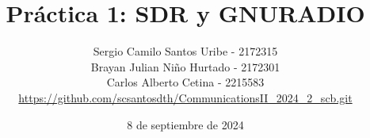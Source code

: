 \documentclass{journal}[IEEEtran, twocolumn]             %
\newcommand{\dochead}{Práctica 1}
\newcommand{\docsubhead}{SDR y GNURADIO}
\newcommand{\titulo}{\dochead: \docsubhead}
\newcommand{\fecha}{8 de septiembre de 2024}
\begin{document}

\title{\textbf{\titulo}}            %

\author{
Sergio Camilo Santos Uribe - 2172315\\
Brayan Julian Niño Hurtado - 2172301\\
Carlos Alberto Cetina - 2215583\\
\href{https://github.com/scsantosdth/CommunicationsII_2024_2_scb.git}{https://github.com/scsantosdth/CommunicationsII_2024_2_scb.git}
}


\date{\fecha}                       %

\maketitle                          %
\thispagestyle{fancy}               %

%


\color{black}
\end{document}
